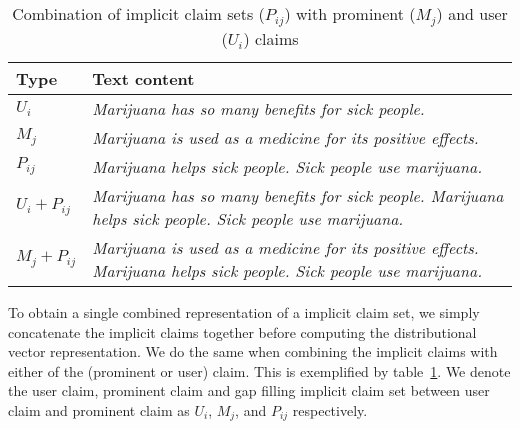 \begin{table}
\begin{center}
{\small
{\def\arraystretch{1.2}\tabcolsep=2pt
\begin{tabular}{@{}lp{13cm}@{}}
\toprule
Type & Text content  \\
\midrule
$U_i$      & \emph{Marijuana has so many benefits for sick people.} \\
$M_j$    & \emph{Marijuana is used as a medicine for its positive effects.}   \\
$P_{ij}$     & \emph{Marijuana helps sick people. Sick people use marijuana.} \\
\midrule
$U_i + P_{ij}$   & \emph{Marijuana has so many benefits for sick people.
Marijuana helps sick people. Sick people use marijuana.} \\ 
$M_j + P_{ij}$   & \emph{Marijuana is used as a medicine for its positive
effects. Marijuana helps sick people. Sick people use marijuana.}\\
\bottomrule
\end{tabular}}}
	\caption{Combination of implicit claim sets ($P_{ij}$) with  prominent
	($M_j$) and user ($U_i$) claims}
\label{tab:argpremise_concatenation}
\end{center}
\end{table}

To obtain a single combined representation of a implicit claim set, we simply
concatenate the implicit claims together before computing the distributional vector
representation. 
We do the same when combining the implicit claims with either of the (prominent or user) claim.
This is exemplified by table~\ref{tab:argpremise_concatenation}. 
We denote the user claim, prominent claim and gap filling implicit claim set between 
user claim and prominent claim as
$U_i$, $M_j$, and $P_{ij}$ respectively. 


